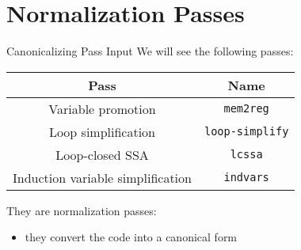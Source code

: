 
\section{Normalization Passes}


\begin{frame}{Canonicalizing Pass Input}
We will see the following passes:

\begin{table}
\centering
\begin{tabular}{cc}
\toprule

\multicolumn{1}{c}{\textbf{Pass}}    &
\multicolumn{1}{c}{\textbf{Name}} \\

\midrule

Variable promotion  &
\texttt{mem2reg}   \\

Loop simplification &
\texttt{loop-simplify} \\

Loop-closed SSA  &
\texttt{lcssa}  \\

Induction variable simplification  &
\texttt{indvars}                  \\

\bottomrule
\end{tabular}
\end{table}

They are \alert{normalization} passes:

\begin{itemize}
\item they convert the code into a canonical form
\end{itemize}
\end{frame}




